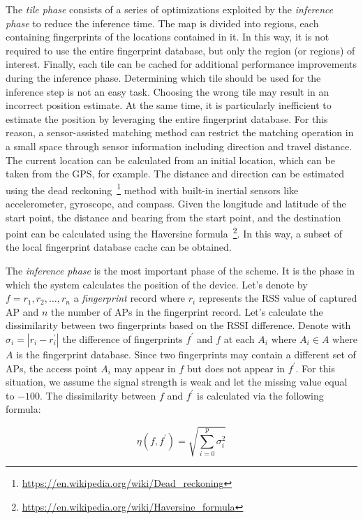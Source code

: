 The \textit{tile phase} consists of a series of optimizations exploited by the \textit{inference phase} to reduce the inference time.
The map is divided into regions, each containing fingerprints of the locations contained in it.
In this way, it is not required to use the entire fingerprint database, but only the region (or regions) of interest.
Finally, each tile can be cached for additional performance improvements during the inference phase.
Determining which tile should be used for the inference step is not an easy task. Choosing the wrong tile may result in an incorrect
position estimate. At the same time, it is particularly inefficient to estimate the position by leveraging the entire fingerprint database.
For this reason, a sensor-assisted matching method can restrict the matching operation in a small space through sensor information including
direction and travel distance. The current location can be calculated from an initial location, which can be taken from the GPS, for example.
The distance and direction can be estimated using the dead reckoning~\footnote{\url{https://en.wikipedia.org/wiki/Dead_reckoning}} method with
built-in inertial sensors like accelerometer, gyroscope, and compass.
Given the longitude and latitude of the start point, the distance and bearing from the start point, and the destination point can be calculated using
the Haversine formula~\footnote{\url{https://en.wikipedia.org/wiki/Haversine_formula}}. In this way, a subset of the local fingerprint database cache
can be obtained.

The \textit{inference phase} is the most important phase of the scheme. It is the phase in which the system calculates the position of the device.
Let's denote by $f = {r_1, r_2, \ldots, r_n}$ a \textit{fingerprint} record where $r_i$ represents the RSS value of captured AP and $n$ the number of
APs in the fingerprint record.
Let's calculate the dissimilarity between two fingerprints based on the RSSI difference.
Denote with $\sigma_i = | r_i - r^{'}_{i}|$ the difference of fingerprints $f^{'}$ and $f$ at each $A_i$ where $A_i \in A$ where $A$ is the
fingerprint database.
Since two fingerprints may contain a different set of APs, the access point $A_i$ may appear in $f$ but does not appear in $f^{'}$.
For this situation, we assume the signal strength is weak and let the missing value equal to $-100$.
The dissimilarity between $f$ and $f^{'}$ is calculated via the following formula:

\begin{equation}
	\eta(f, f^{'}) = \sqrt{\sum_{i=0}^{p} \sigma_i^{2}}
	\label{eq:dissimilarity}
\end{equation}

